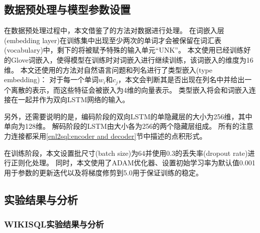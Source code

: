 \subsection{数据预处理与模型参数设置}
在数据预处理过程中，本文借鉴了\cite{dong2018coarse}的方法对数据进行处理。
在词嵌入层(embedding layer)在训练集中出现至少两次的单词才会被保留在词汇表(vocabulary)中，剩下的将被赋予特殊的输入单元“UNK”。
本文使用已经训练好的Glove词嵌入\cite{pennington2014glove}，使得模型在训练时对词嵌入进行继续训练，该词嵌入的维度为16维。
本文还使用\cite{yu2018typesql}的方法对自然语言问题和列名进行了类型嵌入(type embedding)：
对于每一个单词$w_i$和$c_j$，本文会判断其是否出现在列名中并给出一个离散的表示，而这些特征会被嵌入为4维的向量表示。
类型嵌入将会和词嵌入连接在一起并作为双向LSTM网络的输入。

另外，还需要说明的是，编码阶段的双向LSTM的单隐藏层的大小为256维，其中单向为128维。
解码阶段的LSTM由大小各为256的两个隐藏层组成。
所有的注意力连接都采用\ref{enl2sql:encoder and decoder}节中描述的点积形式。

在训练阶段，本文设置批尺寸(batch size)为64并使用0.3的丢失率(dropout rate)进行正则化处理。
同时，本文使用了ADAM优化器\cite{kingma2014adam}、设置初始学习率为默认值0.001用于参数的更新迭代以及将梯度修剪到5.0用于保证训练的稳定。


\subsection{实验结果与分析}
\subsubsection{WIKISQL实验结果与分析}

